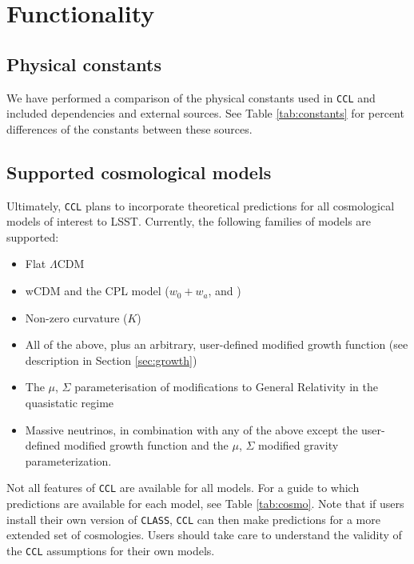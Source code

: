 \documentclass[\docopts]{\docclass}
\newcommand{\ccl}{{\tt CCL}\xspace}
\begin{document}
\section{Functionality}
\label{sec:func}

\subsection{Physical constants}

\label{sec:constants}
We have performed a comparison of the physical constants used in \ccl and included dependencies and external sources. See Table \ref{tab:constants} for percent differences of the constants between these sources.














\subsection{Supported cosmological models}

\label{sec:cosmologies}
Ultimately, \ccl plans to incorporate theoretical predictions for all cosmological models of interest to LSST. Currently, the following families of models are supported:
\begin{itemize}
 \item Flat $\Lambda$CDM
 \item wCDM and the CPL model ($w_0+w_a$, \citealt{Chevallier01} and \citealt{Linder03})
 \item Non-zero curvature ($K$)
 \item All of the above, plus an arbitrary, user-defined modified growth function (see description in Section \ref{sec:growth})
 \item The $\mu$, $\Sigma$ parameterisation of modifications to General Relativity in the quasistatic regime \citep{Silvestri2013, Ferreira2010}
  \item Massive neutrinos, in combination with any of the above except the user-defined modified growth function and the $\mu$, $\Sigma$ modified gravity parameterization.
\end{itemize}

Not all features of \ccl are available for all models. For a guide to which predictions are available for each model, see Table \ref{tab:cosmo}. Note that if users install their own version of {\tt CLASS}, {\tt CCL} can then make predictions for a more extended set of cosmologies. Users should take care to understand the validity of the {\tt CCL} assumptions for their own models.
\end{document}
